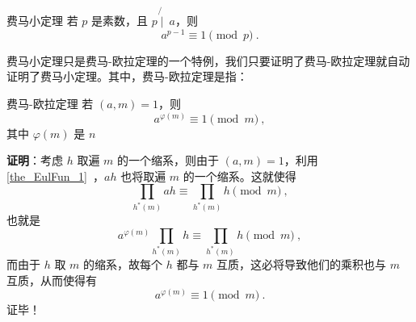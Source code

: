 

\begin{theorem}{费马小定理}
若 $p$ 是素数，且 $p \not{\mid}~ a$，则
\begin{equation}
a^{p-1} \equiv 1 \pmod p ~.
\end{equation}
\end{theorem}

费马小定理只是费马-欧拉定理的一个特例，我们只要证明了费马-欧拉定理就自动证明了费马小定理。其中，费马-欧拉定理是指：
\begin{theorem}{费马-欧拉定理}
若 $(a, m) = 1$，则
\begin{equation}
a^{\varphi(m)} \equiv 1 \pmod m ~,
\end{equation}
其中 $\varphi(m)$ 是 $n$
\end{theorem}
\textbf{证明}：考虑 $h$ 取遍 $m$ 的一个缩系，则由于 $(a, m) = 1$，利用\autoref{the_EulFun_1}~，$ah$ 也将取遍 $m$ 的一个缩系。这就使得
\begin{equation}
\prod_{h^*(m)}{a h} \equiv \prod _{h^*(m)}h \pmod m ~,
\end{equation}
也就是
\begin{equation}
a^{\varphi(m)} \prod_{h^*(m)} h \equiv \prod_{h^*(m)} h \pmod m ~,
\end{equation}
而由于 $h$ 取 $m$ 的缩系，故每个 $h$ 都与 $m$ 互质，这必将导致他们的乘积也与 $m$ 互质，从而使得有
\begin{equation}
a^{\varphi(m)} \equiv 1 \pmod m ~.
\end{equation}
证毕！


